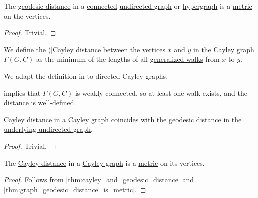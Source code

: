 \begin{proposition}\label{thm:graph_geodesic_distance_is_metric}
  The \hyperref[def:graph_geodesic_distance]{geodesic distance} in a \hyperref[def:graph_connectedness/undirected]{connected} \hyperref[def:undirected_graph]{undirected graph} or \hyperref[def:hypergraph]{hypergraph} is a \hyperref[def:metric_space]{metric} on the vertices.
\end{proposition}
\begin{proof}
  Trivial.
\end{proof}

\begin{definition}\label{def:cayley_distance}\mimprovised
  We define the \term[en=Cayley distance (\cite[def. 2.1.10]{HadelerMüller2017CellularAutomata})]{Cayley distance} between the vertices \( x \) and \( y \) in the \hyperref[def:cayley_graph]{Cayley graph} \( \Gamma(G, C) \) as the minimum of the lengths of all \hyperref[def:graph_walk/generalized]{generalized walks} from \( x \) to \( y \).
\end{definition}
\begin{comments}
  \item We adapt the definition in  to directed Cayley graphs.
\end{comments}
\begin{defproof}
   implies that \( \Gamma(G, C) \) is weakly connected, so at least one walk exists, and the distance is well-defined.
\end{defproof}

\begin{proposition}\label{thm:cayley_and_geodesic_distance}
  \hyperref[def:cayley_distance]{Cayley distance} in a \hyperref[def:cayley_graph]{Cayley graph} coincides with the \hyperref[def:graph_geodesic_distance]{geodesic distance} in the \hyperref[def:multigraph_orientation]{underlying undirected graph}.
\end{proposition}
\begin{proof}
  Trivial.
\end{proof}

\begin{corollary}\label{thm:cayley_distance_is_metric}
  The \hyperref[def:cayley_distance]{Cayley distance} in a \hyperref[def:cayley_graph]{Cayley graph} is a \hyperref[def:metric_space]{metric} on its vertices.
\end{corollary}
\begin{proof}
  Follows from \cref{thm:cayley_and_geodesic_distance} and \cref{thm:graph_geodesic_distance_is_metric}.
\end{proof}

